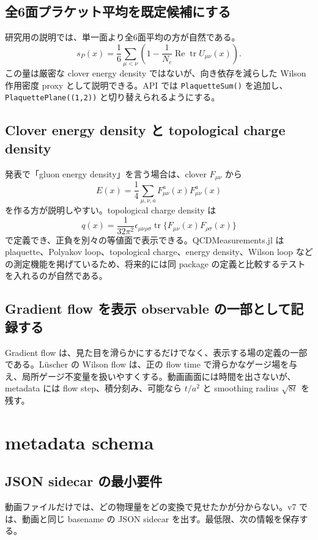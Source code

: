 \documentclass[uplatex,dvipdfmx,ja=standard,11pt,a4paper]{bxjsarticle}
\newcommand{\tr}{\operatorname{tr}}
\newcommand{\Ree}{\operatorname{Re}}
\newcommand{\Nc}{N_c}
\newcommand{\code}[1]{\texttt{#1}}
\begin{document}
\subsection{全6面プラケット平均を既定候補にする}
研究用の説明では、単一面より全6面平均の方が自然である。
\begin{equation}
  s_P(x)=\frac{1}{6}\sum_{\mu<\nu}\left(1-\frac{1}{\Nc}\Ree\tr U_{\mu\nu}(x)\right).
\end{equation}
この量は厳密な clover energy density ではないが、向き依存を減らした Wilson 作用密度 proxy として説明できる。API では \code{PlaquetteSum()} を追加し、\code{PlaquettePlane((1,2))} と切り替えられるようにする。

\subsection{Clover energy density と topological charge density}
発表で「gluon energy density」を言う場合は、clover \(F_{\mu\nu}\) から
\begin{equation}
  E(x)=\frac{1}{4}\sum_{\mu,\nu,a}F^a_{\mu\nu}(x)F^a_{\mu\nu}(x)
\end{equation}
を作る方が説明しやすい。topological charge density は
\begin{equation}
  q(x)=\frac{1}{32\pi^2}\epsilon_{\mu\nu\rho\sigma}\tr\{F_{\mu\nu}(x)F_{\rho\sigma}(x)\}
\end{equation}
で定義でき、正負を別々の等値面で表示できる。QCDMeasurements.jl は plaquette、Polyakov loop、topological charge、energy density、Wilson loop などの測定機能を掲げているため、将来的には同 package の定義と比較するテストを入れるのが自然である\cite{QCDMeasurementsRepo}。

\subsection{Gradient flow を表示 observable の一部として記録する}
Gradient flow は、見た目を滑らかにするだけでなく、表示する場の定義の一部である。Lüscher の Wilson flow は、正の flow time で滑らかなゲージ場を与え、局所ゲージ不変量を扱いやすくする\cite{Luscher2010}。動画画面には時間を出さないが、metadata には flow step、積分刻み、可能なら \(t/a^2\) と smoothing radius \(\sqrt{8t}\) を残す。

\section{metadata schema}
\subsection{JSON sidecar の最小要件}
動画ファイルだけでは、どの物理量をどの変換で見せたかが分からない。v7 では、動画と同じ basename の JSON sidecar を出す。最低限、次の情報を保存する。
\end{document}
